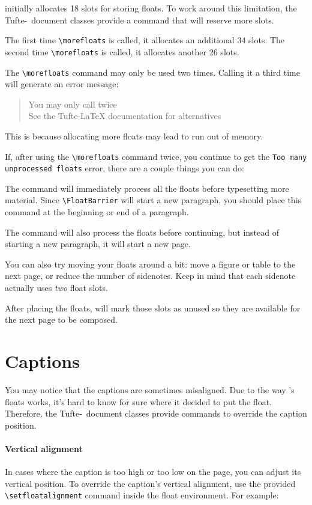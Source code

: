 \documentclass[a4paper]{tufte-handout}
\newcommand{\TL}{Tufte-\hologo{LaTeX}\xspace}
\newcommand{\hlorange}[1]{\textcolor{tufte-orange}{#1}}
\newcommand{\doccmd}[1]{\hlorange{\texttt{\textbackslash#1}}}
\newenvironment{docspec}
  {\begin{quotation}\ttfamily\parskip0pt\parindent0pt\ignorespaces}
  {\end{quotation}}
\begin{document}
 initially allocates 18 slots for storing floats. 
To work around this limitation, the \TL\ document classes provide a  command that will reserve more slots.

The first time \doccmd{morefloats} is called, it allocates an additional 34 slots.
The second time \doccmd{morefloats} is called, it allocates another 26 slots.

The \doccmd{morefloats} command may only be used two times.
Calling it a third time will generate an error message:
\begin{docspec}
  You may only call \string\morefloats\space twice\\
  See the Tufte-LaTeX documentation for alternatives
\end{docspec}
This is because allocating more floats may lead  to run out of memory.

If, after using the \doccmd{morefloats} command twice, you continue to get the \texttt{Too many unprocessed floats} error, there are a couple things you can do:

The  command will immediately process all the floats before typesetting more material.
Since \doccmd{FloatBarrier} will start a new paragraph, you should place this command at the beginning or end of a
paragraph.

The  command will also process the floats before continuing, but instead of starting a new paragraph, it will start a new page.

You can also try moving your floats around a bit: move a figure or table to the next page, or reduce the number of sidenotes.
Keep in mind that each sidenote actually uses \emph{two} float slots.

After placing the floats,  will mark those slots as unused so they are available for the next page to be composed.


\section{Captions}
You may notice that the captions are sometimes misaligned.
Due to the way 's floats works, it's hard to know for sure where it decided to put the float.
Therefore, the \TL\ document classes provide commands to override the caption position.

\paragraph{Vertical alignment}\label{par:vertical-alignment}
In cases where the caption is too high or too low on the page, you can adjust its vertical position.
To override the caption's vertical alignment, use the provided \doccmd{setfloatalignment} command inside the float environment.
For example:
\end{document}
